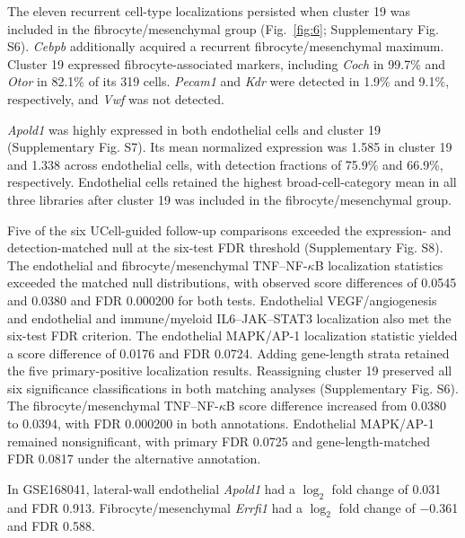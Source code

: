 The eleven recurrent cell-type localizations persisted when cluster 19 was included in the fibrocyte/\allowbreak{}mesenchymal group (Fig.~\ref{fig:6}; Supplementary Fig. S6). \mbox{\textit{Cebpb}} additionally acquired a recurrent fibrocyte/\allowbreak{}mesenchymal maximum. Cluster 19 expressed fibrocyte-associated markers, including \mbox{\textit{Coch}} in 99.7\% and \mbox{\textit{Otor}} in 82.1\% of its 319 cells. \mbox{\textit{Pecam1}} and \mbox{\textit{Kdr}} were detected in 1.9\% and 9.1\%, respectively, and \mbox{\textit{Vwf}} was not detected.

\mbox{\textit{Apold1}} was highly expressed in both endothelial cells and cluster 19 (Supplementary Fig. S7). Its mean normalized expression was 1.585 in cluster 19 and 1.338 across endothelial cells, with detection fractions of 75.9\% and 66.9\%, respectively. Endothelial cells retained the highest broad-cell-category mean in all three libraries after cluster 19 was included in the fibrocyte/\allowbreak{}mesenchymal group.

Five of the six UCell-guided follow-up comparisons exceeded the expression- and detection-matched null at the six-test FDR threshold (Supplementary Fig. S8). The endothelial and fibrocyte/\allowbreak{}mesenchymal TNF--NF-\(\kappa\)B localization statistics exceeded the matched null distributions, with observed score differences of 0.0545 and 0.0380 and FDR 0.000200 for both tests. Endothelial VEGF/\allowbreak{}angiogenesis and endothelial and immune/\allowbreak{}myeloid IL6--JAK--STAT3 localization also met the six-test FDR criterion. The endothelial MAPK/\allowbreak{}AP-1 localization statistic yielded a score difference of 0.0176 and FDR 0.0724. Adding gene-length strata retained the five primary-positive localization results. Reassigning cluster 19 preserved all six significance classifications in both matching analyses (Supplementary Fig. S6). The fibrocyte/\allowbreak{}mesenchymal TNF--NF-\(\kappa\)B score difference increased from 0.0380 to 0.0394, with FDR 0.000200 in both annotations. Endothelial MAPK/\allowbreak{}AP-1 remained nonsignificant, with primary FDR 0.0725 and gene-length-matched FDR 0.0817 under the alternative annotation.

In GSE168041, lateral-wall endothelial \mbox{\textit{Apold1}} had a \(\log_2\) fold change of 0.031 and FDR 0.913. Fibrocyte/\allowbreak{}mesenchymal \mbox{\textit{Errfi1}} had a \(\log_2\) fold change of \(-\)0.361 and FDR 0.588.
